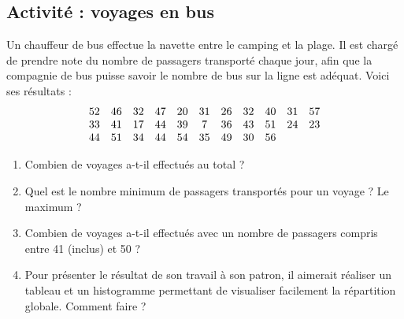
\subsection*{Activité : voyages en bus}

Un chauffeur de bus effectue la navette entre le camping et la plage. Il est chargé de prendre note du nombre de passagers transporté chaque jour, afin que la compagnie de bus puisse savoir le nombre de bus sur la ligne est adéquat. Voici ses résultats :
\begin{equation}
\begin{array}[]{ccccccccccc}
52& 46& 32& 47& 20& 31& 26& 32& 40& 31& 57\\
33& 41& 17& 44& 39& 7& 36& 43& 51& 24& 23\\
44& 51& 34& 44& 54& 35& 49& 30& 56&
\end{array}
\end{equation}

\begin{enumerate}
    \item
 Combien de voyages a-t-il effectués au total ?
 \item
 Quel est le nombre minimum de passagers transportés pour un voyage ? Le maximum ?
\item
 Combien de voyages a-t-il effectués avec un nombre de passagers compris entre 41 (inclus) et 50 ?
\item
 Pour présenter le résultat de son travail à son patron, il aimerait réaliser un tableau et un histogramme permettant de visualiser facilement la répartition globale. Comment faire ?
\end{enumerate}

